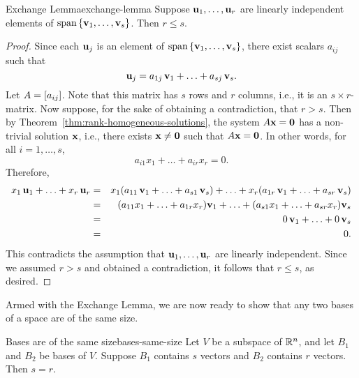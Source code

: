 \begin{lemma}{Exchange Lemma}{exchange-lemma}
  Suppose $\vect{u}_{1},\ldots,\vect{u}_{r}$ are linearly independent
  elements of $\sspan\set{\vect{v}_{1},\ldots,\vect{v}_{s}}$. Then
  $r\leq s$.
\end{lemma}

\begin{proof}
  Since each $\vect{u}_j$ is an element of
  $\sspan\set{\vect{v}_{1},\ldots,\vect{v}_{s}}$, there exist
  scalars $a_{ij}$ such that
  \begin{equation*}
    \vect{u}_{j} = a_{1j}\,\vect{v}_1 + \ldots + a_{sj}\,\vect{v}_s.
  \end{equation*}
  Let $A = \left[a_{ij}\right]$. Note that this matrix has $s$ rows and $r$
  columns, i.e., it is an $s\times r$-matrix. Now suppose, for the
  sake of obtaining a contradiction, that $r>s$. Then by
  Theorem~\ref{thm:rank-homogeneous-solutions}, the system
  $A\vect{x}=\vect{0}$ has a non-trivial solution $\vect{x}$, i.e.,
  there exists $\vect{x}\neq\vect{0}$ such that $A\vect{x}=\vect{0}$.
  In other words, for all $i=1,\ldots,s$,
  \begin{equation*}
    a_{i1}x_1 + \ldots + a_{ir}x_r = 0.
  \end{equation*}
  Therefore,
  \begin{eqnarray*}
    x_1\,\vect{u}_1 + \ldots + x_r\,\vect{u}_r
    &=&
        x_1(a_{11}\,\vect{v}_1 + \ldots + a_{s1}\,\vect{v}_s)
        + \ldots
        + x_r(a_{1r}\,\vect{v}_1 + \ldots + a_{sr}\,\vect{v}_s)
    \\
    &=&
        (a_{11}x_1 + \ldots + a_{1r}x_r)\vect{v}_1
        + \ldots
        + (a_{s1}x_1 + \ldots + a_{sr}x_r)\vect{v}_s
    \\
    &=& 0\,\vect{v}_1 + \ldots + 0\,\vect{v}_s
    \\
    &=& 0.
  \end{eqnarray*}
  This contradicts the assumption that
  $\vect{u}_{1},\ldots,\vect{u}_{r}$ are linearly independent. Since
  we assumed $r>s$ and obtained a contradiction, it follows that
  $r\leq s$, as desired.
\end{proof}

Armed with the Exchange Lemma, we are now ready to show that any two
bases of a space are of the same size.

\begin{theorem}{Bases are of the same size}{bases-same-size}
  Let $V$ be a subspace of\/ $\mathbb{R}^n$, and let $B_1$ and $B_2$ be
  bases of $V$. Suppose $B_1$ contains $s$ vectors and $B_2$ contains
  $r$ vectors. Then $s=r$.
\end{theorem}

